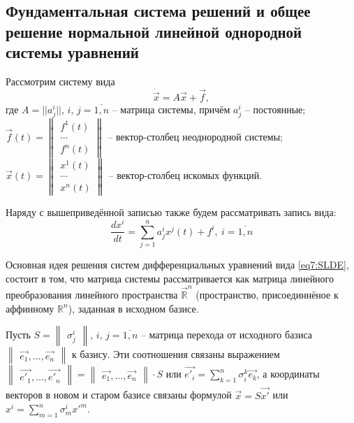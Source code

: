 \subsection{Фундаментальная система решений и общее решение нормальной линейной однородной
системы уравнений}

Рассмотрим систему вида 
\begin{equation}
    \label{eq7:SLDE}
    \dot{\vec{x}} = A \vec{x} + \vec{f},
\end{equation} 
где $A = || a^i_j||$, $i,\,j = \overline{1, n}$ -- матрица системы, 
причём $a^i_j$ -- постоянные; 
$ \vec{f}(t) = 
  \begin{Vmatrix}
    f^1(t) \\
    \cdots    \\
    f^n(t)
  \end{Vmatrix}$ -- вектор-столбец неоднородной системы;
$\vec{x}(t) = 
\begin{Vmatrix}
  x^1(t) \\
  \cdots    \\
  x^n(t)
\end{Vmatrix}$ -- вектор-столбец искомых функций.  


Наряду с вышеприведённой записью также будем рассматривать запись вида: 
$$\frac{dx^i}{dt} = \sum\limits^n_{j=1}a^i_j x^j(t) + f^i, ~i = \overline{1, n}$$

Основная идея решения систем дифференциальных уравнений вида \eqref{eq7:SLDE}, 
состоит в том, что матрица системы рассматривается как матрица линейного преобразования 
линейного пространства $\vec{\mathbb{R}}^n$ (пространство, присоединнёное к аффинному 
$\mathbb{R}^n$), заданная в исходном базисе. 

Пусть $S = \begin{Vmatrix} \sigma_j^i \end{Vmatrix}$, $i,\,j = \overline{1, n}$ -- матрица перехода от исходного базиса $\begin{Vmatrix} \vec{e_1}, ..., \vec{e_n} \end{Vmatrix}$ к базису. 
Эти соотношения связаны выражением $ \begin{Vmatrix} \vec{e'_1}, ..., \vec{e'_n} \end{Vmatrix}  = \begin{Vmatrix} \vec{e_1}, ..., \vec{e_n} \end{Vmatrix} \cdot S $ 
или $\vec{e'_i} = \sum\limits_{k = 1}^n \sigma_i^k \vec{e_k}$, а координаты векторов в новом и старом базисе связаны формулой $\vec{x} = S \vec{x'}$ или $x^i = \sum\limits_{m = 1}^n \sigma_m^i {x'}^m$.

